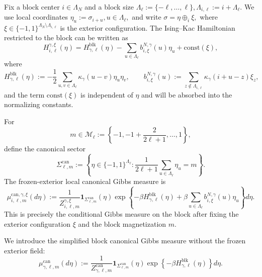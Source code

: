 \documentclass{article}
\begin{document}
Fix a block center \(i\in\Lambda_N\) and a block size
\(
\Lambda_\ell:=\{-\ell,\dots,\ell\},
\Lambda_{i,\ell}:=i+\Lambda_\ell.
\)
We use local coordinates
\(
\eta_u:=\sigma_{i+u}, u\in\Lambda_\ell,
\)
and write
\(
\sigma=\eta\oplus_i\xi,
\)
where
\(
\xi\in\{-1,1\}^{\Lambda_N\setminus\Lambda_{i,\ell}}
\) 
is the exterior configuration.
The Ising--Kac Hamiltonian restricted to the block can be written as
\begin{equation}
\label{eq:frozen-exterior-Hamiltonian}
H_{i,\ell}^{\gamma,\xi}(\eta)
=
H_{\gamma,\ell}^{\mathrm{blk}}(\eta)
-
\sum_{u\in\Lambda_\ell}
b_{i,\xi}^{N,\gamma}(u)\eta_u
+
\mathrm{const}(\xi),
\end{equation}
where
\[
H_{\gamma,\ell}^{\mathrm{blk}}(\eta)
:=
-\frac12
\sum_{u,v\in\Lambda_\ell}
\kappa_\gamma(u-v)\eta_u\eta_v, \qquad b_{i,\xi}^{N,\gamma}(u) := \sum_{z\notin\Lambda_{i,\ell}}
\kappa_\gamma(i+u-z)\xi_z,
\]
and the term \(\mathrm{const}(\xi)\) is independent of \(\eta\) and will be absorbed into the normalizing constants.

For
\[
m\in\mathcal M_\ell
:=
\left\{
-1,-1+\frac{2}{2\ell+1},\dots,1
\right\},
\]
define the canonical sector
\[
\Sigma_{\ell,m}^{\mathrm{can}}
:=
\left\{
\eta\in\{-1,1\}^{\Lambda_\ell}:
\frac{1}{2\ell+1}
\sum_{u\in\Lambda_\ell}\eta_u=m
\right\}.
\]
The frozen-exterior local canonical Gibbs measure is
\begin{equation}
\label{eq:frozen-local-canonical}
\mu_{i,\ell,m}^{\mathrm{can},\gamma,\xi}(d\eta)
:=
\frac{1}{Z_{i,\ell,m}^{\gamma,\xi}}
\mathbf 1_{\Sigma_{\ell,m}^{\mathrm{can}}}(\eta)
\exp\left\{
-\beta H_{\gamma,\ell}^{\mathrm{blk}}(\eta)
+
\beta\sum_{u\in\Lambda_\ell}
b_{i,\xi}^{N,\gamma}(u)\eta_u
\right\}
d\eta.
\end{equation}
This is precisely the conditional Gibbs measure on the block after fixing the exterior configuration \(\xi\) and the block magnetization \(m\).

We introduce the simplified block canonical Gibbs measure without the frozen exterior field:
\begin{equation}\label{eq:simplified-block-canonical}
\mu_{\gamma,\ell,m}^{\mathrm{can}}(d\eta)
:=
\frac{1}{Z_{\gamma,\ell,m}^{\mathrm{can}}}
\mathbf 1_{\Sigma_{\ell,m}^{\mathrm{can}}}(\eta)
\exp\left\{
-\beta H_{\gamma,\ell}^{\mathrm{blk}}(\eta)
\right\}
d\eta.
\end{equation}
\end{document}
